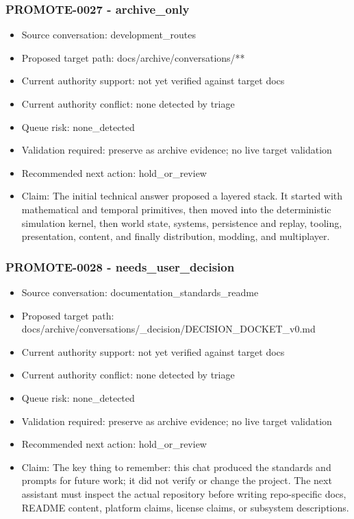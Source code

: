 \documentclass[11pt,a4paper]{report}
\begin{document}
\subsubsection{PROMOTE-0027 - archive\_only}

\begin{itemize}
\item Source conversation: development\_routes
\item Proposed target path: docs/archive/conversations/**
\item Current authority support: not yet verified against target docs
\item Current authority conflict: none detected by triage
\item Queue risk: none\_detected
\item Validation required: preserve as archive evidence; no live target validation
\item Recommended next action: hold\_or\_review
\item Claim: The initial technical answer proposed a layered stack. It started with mathematical and temporal primitives, then moved into the deterministic simulation kernel, then world state, systems, persistence and replay, tooling, presentation, content, and finally distribution, modding, and multiplayer.
\end{itemize}

\subsubsection{PROMOTE-0028 - needs\_user\_decision}

\begin{itemize}
\item Source conversation: documentation\_standards\_readme
\item Proposed target path: docs/archive/conversations/\_decision/DECISION\_DOCKET\_v0.md
\item Current authority support: not yet verified against target docs
\item Current authority conflict: none detected by triage
\item Queue risk: none\_detected
\item Validation required: preserve as archive evidence; no live target validation
\item Recommended next action: hold\_or\_review
\item Claim: The key thing to remember: this chat produced the standards and prompts for future work; it did not verify or change the project. The next assistant must inspect the actual repository before writing repo-specific docs, README content, platform claims, license claims, or subsystem descriptions.
\end{itemize}
\end{document}
